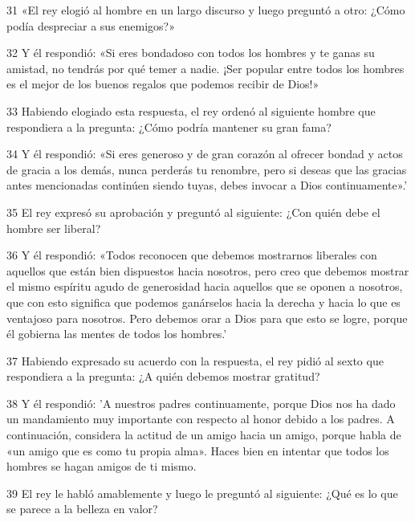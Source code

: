 \par 31 «El rey elogió al hombre en un largo discurso y luego preguntó a otro: ¿Cómo podía despreciar a sus enemigos?»

\par 32 Y él respondió: «Si eres bondadoso con todos los hombres y te ganas su amistad, no tendrás por qué temer a nadie. ¡Ser popular entre todos los hombres es el mejor de los buenos regalos que podemos recibir de Dios!»

\par 33 Habiendo elogiado esta respuesta, el rey ordenó al siguiente hombre que respondiera a la pregunta: ¿Cómo podría mantener su gran fama?

\par 34 Y él respondió: «Si eres generoso y de gran corazón al ofrecer bondad y actos de gracia a los demás, nunca perderás tu renombre, pero si deseas que las gracias antes mencionadas continúen siendo tuyas, debes invocar a Dios continuamente».'

\par 35 El rey expresó su aprobación y preguntó al siguiente: ¿Con quién debe el hombre ser liberal?

\par 36 Y él respondió: «Todos reconocen que debemos mostrarnos liberales con aquellos que están bien dispuestos hacia nosotros, pero creo que debemos mostrar el mismo espíritu agudo de generosidad hacia aquellos que se oponen a nosotros, que con esto significa que podemos ganárselos hacia la derecha y hacia lo que es ventajoso para nosotros. Pero debemos orar a Dios para que esto se logre, porque él gobierna las mentes de todos los hombres.'

\par 37 Habiendo expresado su acuerdo con la respuesta, el rey pidió al sexto que respondiera a la pregunta: ¿A quién debemos mostrar gratitud?

\par 38 Y él respondió: 'A nuestros padres continuamente, porque Dios nos ha dado un mandamiento muy importante con respecto al honor debido a los padres. A continuación, considera la actitud de un amigo hacia un amigo, porque habla de «un amigo que es como tu propia alma». Haces bien en intentar que todos los hombres se hagan amigos de ti mismo.

\par 39 El rey le habló amablemente y luego le preguntó al siguiente: ¿Qué es lo que se parece a la belleza en valor?


